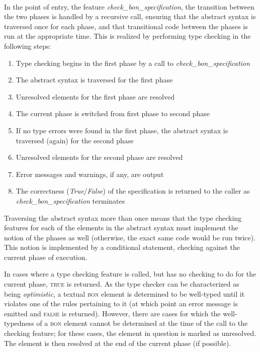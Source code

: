 \paragraph{}
In the point of entry, the feature \textit{check\_bon\_specification}, the transition between the two phases is handled by a recursive call, ensuring that the abstract syntax is traversed once for each phase, and that transitional code between the phases is run at the appropriate time. This is realized by performing type checking in the following steps:

\begin{enumerate}
\item Type checking begins in the first phase by a call to \textit{check\_bon\_specification}
\item The abstract syntax is traversed for the first phase
\item Unresolved elements for the first phase are resolved
\item The current phase is switched from first phase to second phase
\item If no type errors were found in the first phase, the abstract syntax is traversed (again) for the second phase
\item Unresolved elements for the second phase are resolved
\item Error messages and warnings, if any, are output
\item The correctness (\textit{True}/\textit{False}) of the specification is returned to the caller as \textit{check\_bon\_specification} terminates
\end{enumerate}

Traversing the abstract syntax more than once means that the type checking features for each of the elements in the abstract syntax must implement the notion of the phases as well (otherwise, the exact same code would be run twice). This notion is implemented by a conditional statement, checking against the current phase of execution.

In cases where a type checking feature is called, but has no checking to do for the current phase, \textsc{true} is returned. As the type checker can be characterized as being \textit{optimistic}, a textual \textsc{bon} element is determined to be well-typed until it violates one of the rules pertaining to it (at which point an error message is emitted and \textsc{false} is returned). However, there are cases for which the well-typedness of a \textsc{bon} element cannot be determined at the time of the call to the checking feature; for these cases, the element in question is marked as unresolved. The element is then resolved at the end of the current phase (if possible).
